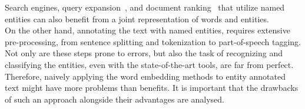 Search engines, query expansion~, and document ranking~ that utilize named entities can also benefit from a joint representation of words and entities.\\
On the other hand, annotating the text with named entities, requires extensive pre-processing, from sentence splitting and tokenization to part-of-speech tagging. Not only are these steps prone to errors, but also the task of recognizing and classifying the entities, even with the state-of-the-art tools, are far from perfect. Therefore, naively applying the word embedding methods to entity annotated text might have more problems than benefits. It is important that the drawbacks of such an approach alongside their advantages are analysed. 

%


